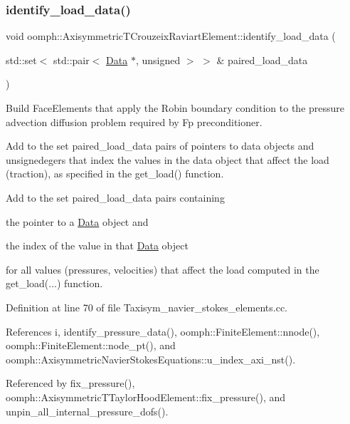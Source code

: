\subsubsection{\texorpdfstring{identify\+\_\+load\+\_\+data()}{identify\_load\_data()}}
{\footnotesize\ttfamily void oomph\+::\+Axisymmetric\+T\+Crouzeix\+Raviart\+Element\+::identify\+\_\+load\+\_\+data (\begin{DoxyParamCaption}\item[{std\+::set$<$ std\+::pair$<$ \hyperlink{classoomph_1_1Data}{Data} $\ast$, unsigned $>$ $>$ \&}]{paired\+\_\+load\+\_\+data }\end{DoxyParamCaption})}



Build Face\+Elements that apply the Robin boundary condition to the pressure advection diffusion problem required by Fp preconditioner. 

Add to the set paired\+\_\+load\+\_\+data pairs of pointers to data objects and unsignedegers that index the values in the data object that affect the load (traction), as specified in the get\+\_\+load() function.

Add to the set {\ttfamily paired\+\_\+load\+\_\+data} pairs containing
\begin{DoxyItemize}
\item the pointer to a \hyperlink{classoomph_1_1Data}{Data} object and
\item the index of the value in that \hyperlink{classoomph_1_1Data}{Data} object
\end{DoxyItemize}for all values (pressures, velocities) that affect the load computed in the {\ttfamily get\+\_\+load}(...) function. 

Definition at line 70 of file Taxisym\+\_\+navier\+\_\+stokes\+\_\+elements.\+cc.



References i, identify\+\_\+pressure\+\_\+data(), oomph\+::\+Finite\+Element\+::nnode(), oomph\+::\+Finite\+Element\+::node\+\_\+pt(), and oomph\+::\+Axisymmetric\+Navier\+Stokes\+Equations\+::u\+\_\+index\+\_\+axi\+\_\+nst().



Referenced by fix\+\_\+pressure(), oomph\+::\+Axisymmetric\+T\+Taylor\+Hood\+Element\+::fix\+\_\+pressure(), and unpin\+\_\+all\+\_\+internal\+\_\+pressure\+\_\+dofs().

\mbox{\label{classoomph_1_1AxisymmetricTCrouzeixRaviartElement_af65900dbadfec7b6e7ad2be8ef63c51c}} 
